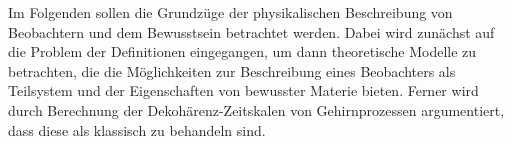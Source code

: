 \begin{center}
	\parbox{0.8\textwidth}{Im Folgenden sollen die Grundzüge der physikalischen Beschreibung von Beobachtern und
		dem Bewusstsein  betrachtet werden. Dabei wird zunächst auf die Problem der 
		Definitionen eingegangen, um dann theoretische Modelle zu betrachten, die die
		Möglichkeiten zur Beschreibung eines Beobachters als Teilsystem und der Eigenschaften 
		von bewusster Materie bieten. Ferner wird durch Berechnung der Dekohärenz-Zeitskalen 
		von Gehirnprozessen argumentiert, dass diese als klassisch zu behandeln sind.}
\end{center}
